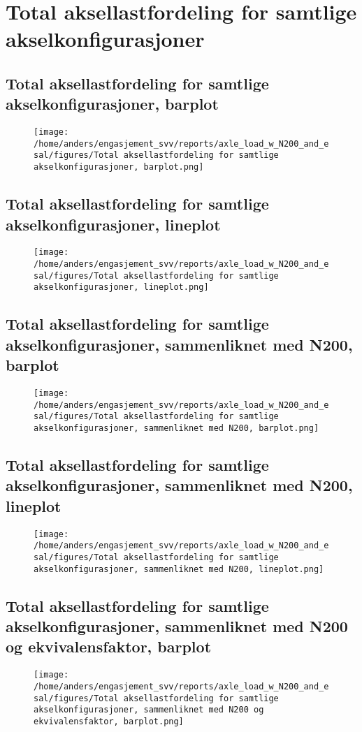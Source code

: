 \documentclass{article}
\begin{document}
\section{Total aksellastfordeling for samtlige akselkonfigurasjoner}
\subsection{Total aksellastfordeling for samtlige akselkonfigurasjoner, barplot}
\begin{figure}[H]
\centering
\texttt{[image: /home/anders/engasjement\_svv/reports/axle\_load\_w\_N200\_and\_esal/figures/Total aksellastfordeling for samtlige akselkonfigurasjoner, barplot.png]}
\end{figure}
\subsection{Total aksellastfordeling for samtlige akselkonfigurasjoner, lineplot}
\begin{figure}[H]
\centering
\texttt{[image: /home/anders/engasjement\_svv/reports/axle\_load\_w\_N200\_and\_esal/figures/Total aksellastfordeling for samtlige akselkonfigurasjoner, lineplot.png]}
\end{figure}
\subsection{Total aksellastfordeling for samtlige akselkonfigurasjoner, sammenliknet med N200, barplot}
\begin{figure}[H]
\centering
\texttt{[image: /home/anders/engasjement\_svv/reports/axle\_load\_w\_N200\_and\_esal/figures/Total aksellastfordeling for samtlige akselkonfigurasjoner, sammenliknet med N200, barplot.png]}
\end{figure}
\subsection{Total aksellastfordeling for samtlige akselkonfigurasjoner, sammenliknet med N200, lineplot}
\begin{figure}[H]
\centering
\texttt{[image: /home/anders/engasjement\_svv/reports/axle\_load\_w\_N200\_and\_esal/figures/Total aksellastfordeling for samtlige akselkonfigurasjoner, sammenliknet med N200, lineplot.png]}
\end{figure}
\subsection{Total aksellastfordeling for samtlige akselkonfigurasjoner, sammenliknet med N200 og ekvivalensfaktor, barplot}
\begin{figure}[H]
\centering
\texttt{[image: /home/anders/engasjement\_svv/reports/axle\_load\_w\_N200\_and\_esal/figures/Total aksellastfordeling for samtlige akselkonfigurasjoner, sammenliknet med N200 og ekvivalensfaktor, barplot.png]}
\end{figure}
\end{document}
